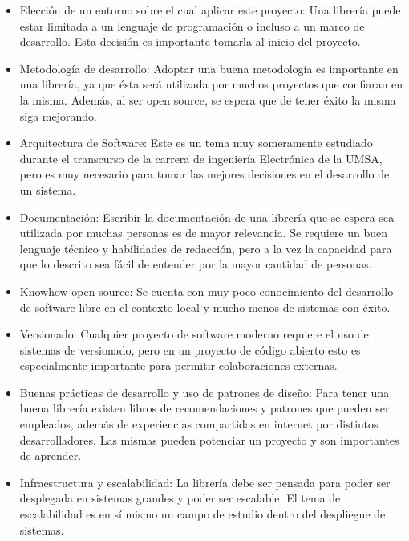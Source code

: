 \begin{itemize}
    \item Elección de un entorno sobre el cual aplicar este proyecto: Una librería puede estar limitada a un lenguaje de programación o incluso a un marco de desarrollo. Esta decisión es importante tomarla al inicio del proyecto.
    \item Metodología de desarrollo: Adoptar una buena metodología es importante en una librería, ya que ésta será utilizada por muchos proyectos que confiaran en la misma. Además, al ser open source, se espera que de tener éxito la misma siga mejorando.
    \item Arquitectura de Software: Este es un tema muy someramente estudiado durante el transcurso de la carrera de ingeniería Electrónica de la UMSA, pero es muy necesario para tomar las mejores decisiones en el desarrollo de un sistema.
    \item Documentación: Escribir la documentación de una librería que se espera sea utilizada por muchas personas es de mayor relevancia. Se requiere un buen lenguaje técnico y habilidades de redacción, pero a la vez la capacidad para que lo descrito sea fácil de entender por la mayor cantidad de personas.
    \item Knowhow open source: Se cuenta con muy poco conocimiento del desarrollo de software libre en el contexto local y mucho menos de sistemas con éxito.
    \item Versionado: Cualquier proyecto de software moderno requiere el uso de sistemas de versionado, pero en un proyecto de código abierto esto es especialmente importante para permitir colaboraciones externas.
    \item Buenas prácticas de desarrollo y uso de patrones de diseño: Para tener una buena librería existen libros de recomendaciones y patrones que pueden ser empleados, además de experiencias compartidas en internet por distintos desarrolladores. Las mismas pueden potenciar un proyecto y son importantes de aprender.
    \item Infraestructura y escalabilidad: La librería debe ser pensada para poder ser desplegada en sistemas grandes y poder ser escalable. El tema de escalabilidad es en sí mismo un campo de estudio dentro del despliegue de sistemas.
\end{itemize}



